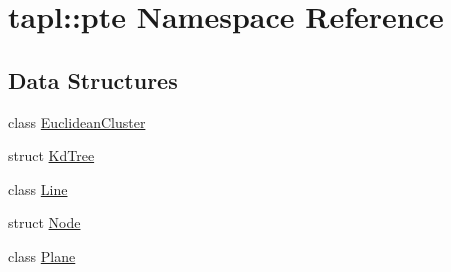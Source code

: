 \hypertarget{namespacetapl_1_1pte}{}\section{tapl\+:\+:pte Namespace Reference}
\label{namespacetapl_1_1pte}
\subsection*{Data Structures}
\begin{DoxyCompactItemize}
\item 
class \hyperlink{classtapl_1_1pte_1_1EuclideanCluster}{Euclidean\+Cluster}
\item 
struct \hyperlink{structtapl_1_1pte_1_1KdTree}{Kd\+Tree}
\item 
class \hyperlink{classtapl_1_1pte_1_1Line}{Line}
\item 
struct \hyperlink{structtapl_1_1pte_1_1Node}{Node}
\item 
class \hyperlink{classtapl_1_1pte_1_1Plane}{Plane}
\end{DoxyCompactItemize}
